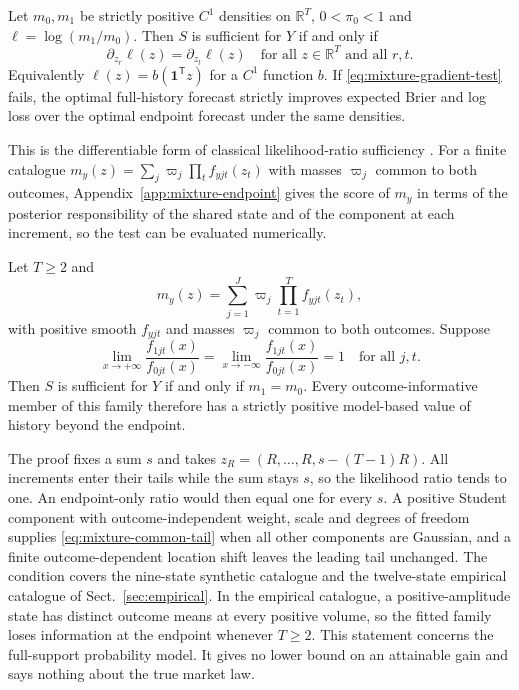 \documentclass[runningheads]{llncs}
\newcommand{\R}{\mathbb R}
\begin{document}
\begin{proposition}
\label{prop:mixture-endpoint-gradient}
Let $m_0,m_1$ be strictly positive $C^1$ densities on $\R^T$, $0<\pi_0<1$ and $\ell=\log(m_1/m_0)$. Then $S$ is sufficient for $Y$ if and only if
\begin{equation}
 \partial_{z_r}\ell(z)=\partial_{z_t}\ell(z)\quad\text{for all }z\in\R^T\text{ and all }r,t.
 \label{eq:mixture-gradient-test}
\end{equation}
Equivalently $\ell(z)=b(\boldsymbol1^{\mathsf T}z)$ for a $C^1$ function $b$. If \eqref{eq:mixture-gradient-test} fails, the optimal full-history forecast strictly improves expected Brier and log loss over the optimal endpoint forecast under the same densities.
\end{proposition}
This is the differentiable form of classical likelihood-ratio sufficiency \cite{pitman1936sufficient}. For a finite catalogue $m_y(z)=\sum_j\varpi_j\prod_tf_{yjt}(z_t)$ with masses $\varpi_j$ common to both outcomes, Appendix~\ref{app:mixture-endpoint} gives the score of $m_y$ in terms of the posterior responsibility of the shared state and of the component at each increment, so the test can be evaluated numerically.

\begin{proposition}
\label{prop:mixture-endpoint-tail}
Let $T\geq2$ and
\[
 m_y(z)=\sum_{j=1}^J\varpi_j\prod_{t=1}^T f_{yjt}(z_t),
\]
with positive smooth $f_{yjt}$ and masses $\varpi_j$ common to both outcomes. Suppose
\begin{equation}
 \lim_{x\to+\infty}\frac{f_{1jt}(x)}{f_{0jt}(x)}=\lim_{x\to-\infty}\frac{f_{1jt}(x)}{f_{0jt}(x)}=1\quad\text{for all }j,t.
 \label{eq:mixture-common-tail}
\end{equation}
Then $S$ is sufficient for $Y$ if and only if $m_1=m_0$. Every outcome-informative member of this family therefore has a strictly positive model-based value of history beyond the endpoint.
\end{proposition}
The proof fixes a sum $s$ and takes $z_R=(R,\ldots,R,s-(T-1)R)$. All increments enter their tails while the sum stays $s$, so the likelihood ratio tends to one. An endpoint-only ratio would then equal one for every $s$. A positive Student component with outcome-independent weight, scale and degrees of freedom supplies \eqref{eq:mixture-common-tail} when all other components are Gaussian, and a finite outcome-dependent location shift leaves the leading tail unchanged. The condition covers the nine-state synthetic catalogue and the twelve-state empirical catalogue of Sect.~\ref{sec:empirical}. In the empirical catalogue, a positive-amplitude state has distinct outcome means at every positive volume, so the fitted family loses information at the endpoint whenever $T\geq2$. This statement concerns the full-support probability model. It gives no lower bound on an attainable gain and says nothing about the true market law.
\end{document}
